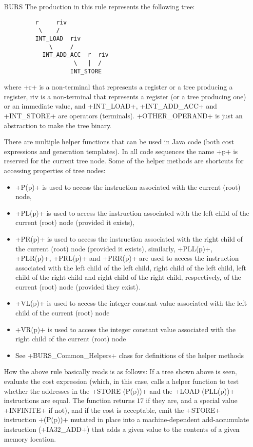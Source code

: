 \begin{section}{BURS}
The production in this rule represents the following tree:
\begin{lstlisting}
         r     riv
          \    /
         INT_LOAD  riv
             \     /
           INT_ADD_ACC  r  riv
                    \   |  /
                   INT_STORE
\end{lstlisting}

where \spverb+r+ is a non-terminal that represents a register or a tree producing a register, riv is a non-terminal that represents a register (or a tree producing one) or an immediate value, and \spverb+INT_LOAD+, \spverb+INT_ADD_ACC+ and \spverb+INT_STORE+ are operators (terminals). \spverb+OTHER_OPERAND+ is just an abstraction to make the tree binary.

There are multiple helper functions that can be used in Java code (both cost expressions and generation templates). In all code sequences the name \spverb+p+ is reserved for the current tree node. Some of the helper methods are shortcuts for accessing properties of tree nodes:
\begin{itemize}
  \item \spverb+P(p)+ is used to access the instruction associated with the current (root) node,
  \item \spverb+PL(p)+ is used to access the instruction associated with the left child of the current (root) node (provided it exists),
  \item \spverb+PR(p)+ is used to access the instruction associated with the right child of the current (root) node (provided it exists),
    similarly,  \spverb+PLL(p)+,  \spverb+PLR(p)+,  \spverb+PRL(p)+ and  \spverb+PRR(p)+ are used to access the instruction associated with the left child of the left child, right child of the left child, left child of the right child and right child of the right child, respectively, of the current (root) node (provided they exist).
  \item \spverb+VL(p)+ is used to access the integer constant value associated with the left child of the current (root) node
  \item \spverb+VR(p)+ is used to access the integer constant value associated with the right child of the current (root) node
  \item See \spverb+BURS_Common_Helpers+ class for definitions of the helper methods
\end{itemize}

How the above rule basically reads is as follows:
If a tree shown above is seen, evaluate the cost expression (which, in this case, calls a helper function to test whether the addresses in the \spverb+STORE (P(p))+ and the \spverb+LOAD (PLL(p))+ instructions are equal. The function returns $17$ if they are, and a special value \spverb+INFINITE+ if not), and if the cost is acceptable, emit the \spverb+STORE+ instruction \spverb+(P(p))+ mutated in place into a machine-dependent add-accumulate instruction (\spverb+IA32_ADD+) that adds a given value to the contents of a given memory location.


\end{section}
